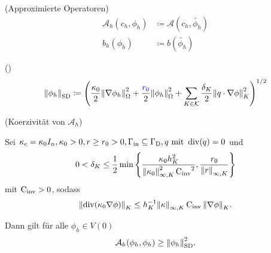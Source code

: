 \begin{define}(Approximierte Operatoren)
	\begin{align*}
		\mathcal{A}_h(c_h, \phi_h) &\coloneqq 
		\mathcal{A}(c_h,\tilde{\phi_h}) \\
		b_h(\phi_h) &\coloneqq  b(\tilde{\phi_h})
	\end{align*}
\end{define}


\begin{define}()
	 \[ \norm{\phi_h}_{\operatorname{\text{SD}}} \coloneqq \left( \frac{\kappa_0}{2} \norm{\nabla \phi_h}_\Omega^2 + \frac{\textcolor{blue}{r_0}}{2} \norm{\phi_h}_\Omega^2+ \sum_{K \in \mathcal{K}} \frac{\delta_K}{2} \norm{q \cdot \nabla \phi}_K^2  \right)^{1/2}  \]
\end{define}

\begin{Lemma}(Koerzivität von $ \mathcal{A}_h $)
	
	Sei $ \kappa_c = \kappa_0 I_n, \kappa_0 > 0, r \geq r_0 > 0, \Gamma_{{\text{in}}} \subseteq \Gamma_{\text{D}}, q \text{ mit } \operatorname{div}(q) = 0 $ und \[ 0 < \delta_K \leq \frac{1}{2} \min\left\{ \frac{\kappa_0 h_K^2}{\norm{\kappa_0}_{\infty,K}^2 \operatorname{C_{\text{inv}}}^2} , \frac{r_0}{\norm{r}_{\infty, K}}   \right\}\] mit $ \operatorname{C_{\text{inv}}} > 0 $, sodass  \[ \norm{\operatorname{div}(\kappa_0 \nabla \phi)}_K \leq h_K^{-1} \norm{\kappa}_{\infty,K} \operatorname{C_{\text{inv}}} \norm{\nabla \phi}_K. \]
	
	Dann gilt für alle $ \phi_h \in V(0) $
	\[ \mathcal{A}_h(\phi_h, \phi_h) \geq \norm{\phi_h}_{\operatorname{\text{SD}}}^2. \]
\end{Lemma}

